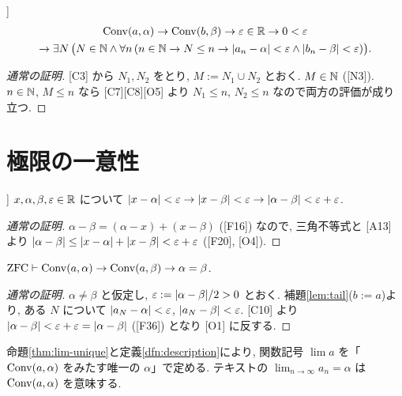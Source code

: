 \begin{lem}[尾部の共通化 [C9]]\label{lem:tail}
  \begin{multline*}
    \mathrm{Conv}(a, \alpha) \to \mathrm{Conv}(b, \beta) \to \varepsilon \in \mathbb{R} \to 0 < \varepsilon \\
    \to \exists N\,\bigl(N \in \mathbb{N} \land \forall n\,(n \in \mathbb{N} \to N \leq n \to \lvert a_n - \alpha\rvert < \varepsilon \land \lvert b_n - \beta\rvert < \varepsilon)\bigr).
  \end{multline*}
\end{lem}
\begin{proof}[通常の証明]
  [C3] から $N_1, N_2$ をとり, $M := N_1 \cup N_2$ とおく. $M \in \mathbb{N}$ ([N3]). $n \in \mathbb{N}$, $M \leq n$ なら [C7][C8][O5] より $N_1 \leq n$, $N_2 \leq n$ なので両方の評価が成り立つ.
\end{proof}

\section{極限の一意性}

\begin{lem}[[C10]]
  $x, \alpha, \beta, \varepsilon \in \mathbb{R}$ について $\lvert x - \alpha\rvert < \varepsilon \to \lvert x - \beta\rvert < \varepsilon \to \lvert \alpha - \beta\rvert < \varepsilon + \varepsilon$.
\end{lem}
\begin{proof}[通常の証明]
  $\alpha - \beta = (\alpha - x) + (x - \beta)$ ([F16]) なので, 三角不等式と [A13] より $\lvert \alpha - \beta\rvert \leq \lvert x - \alpha\rvert + \lvert x - \beta\rvert < \varepsilon + \varepsilon$ ([F20], [O4]).
\end{proof}

\begin{prop}\label{thm:lim-unique}
  $\mathrm{ZFC} \vdash \mathrm{Conv}(a, \alpha) \to \mathrm{Conv}(a, \beta) \to \alpha = \beta$.
\end{prop}
\begin{proof}[通常の証明]
  $\alpha \neq \beta$ と仮定し, $\varepsilon := \lvert \alpha - \beta\rvert/2 > 0$ とおく. 補題\ref{lem:tail}($b := a$)より, ある $N$ について $\lvert a_N - \alpha\rvert < \varepsilon$, $\lvert a_N - \beta\rvert < \varepsilon$. [C10] より $\lvert \alpha - \beta\rvert < \varepsilon + \varepsilon = \lvert \alpha - \beta\rvert$ ([F36]) となり [O1] に反する.
\end{proof}

\begin{dfn}[$\lim$]
  命題\ref{thm:lim-unique}と定義\ref{dfn:description}により, 関数記号 $\lim a$ を「$\mathrm{Conv}(a, \alpha)$ をみたす唯一の $\alpha$」で定める. テキストの $\lim_{n\to\infty} a_n = \alpha$ は $\mathrm{Conv}(a, \alpha)$ を意味する.
\end{dfn}

